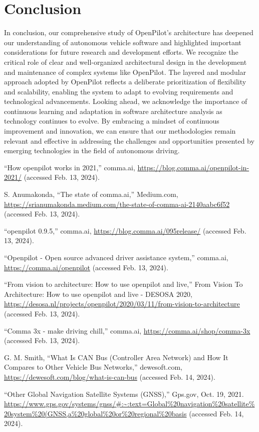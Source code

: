 \documentclass[12pt]{article}
\begin{document}
\section{Conclusion}
In conclusion, our comprehensive study of OpenPilot's architecture has deepened our understanding of autonomous vehicle software and highlighted important considerations for future research and development efforts. We recognize the critical role of clear and well-organized architectural design in the development and maintenance of complex systems like OpenPilot. The layered and modular approach adopted by OpenPilot reflects a deliberate prioritization of flexibility and scalability, enabling the system to adapt to evolving requirements and technological advancements. Looking ahead, we acknowledge the importance of continuous learning and adaptation in software architecture analysis as technology continues to evolve. By embracing a mindset of continuous improvement and innovation, we can ensure that our methodologies remain relevant and effective in addressing the challenges and opportunities presented by emerging technologies in the field of autonomous driving.

\begin{thebibliography}{00}

     “How openpilot works in 2021,” comma.ai, \url{https://blog.comma.ai/openpilot-in-2021/} (accessed Feb. 13, 2024). 

     S. Anumakonda, “The state of comma.ai,” Medium.com, \url{https://srianumakonda.medium.com/the-state-of-comma-ai-2140aabc6f52} (accessed Feb. 13, 2024).

     “openpilot 0.9.5,” comma.ai, \url{https://blog.comma.ai/095release/} (accessed Feb. 13, 2024).

     “Openpilot - Open source advanced driver assistance system,” comma.ai, \url{https://comma.ai/openpilot} (accessed Feb. 13, 2024).

     “From vision to architecture: How to use openpilot and live,” From Vision To Architecture: How to use openpilot and live - DESOSA 2020, \url{https://desosa.nl/projects/openpilot/2020/03/11/from-vision-to-architecture} (accessed Feb. 13, 2024).

     “Comma 3x - make driving chill,” comma.ai, \url{https://comma.ai/shop/comma-3x} (accessed Feb. 13, 2024). 

     G. M. Smith, “What Is CAN Bus (Controller Area Network) and How It Compares to Other Vehicle Bus Networks,” dewesoft.com,
    \url{https://dewesoft.com/blog/what-is-can-bus} (accessed Feb. 14, 2024).
    
     “Other Global Navigation Satellite Systems (GNSS),” Gps.gov, Oct. 19, 2021.
    \url{https://www.gps.gov/systems/gnss/#:~:text=Global%20navigation%20satellite%20system%20(GNSS,a%20global%20or%20regional%20basis} (accessed Feb. 14, 2024).

\end{thebibliography}
\end{document}
